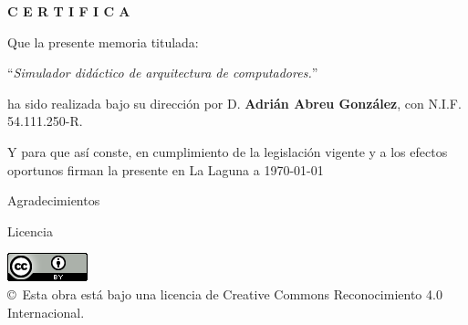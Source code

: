 \documentclass[spanish,a4paper,14pt,oneside]{extreport}
\begin{document}
\bigskip
\bigskip
{\bf C E R T I F I C A}

\bigskip
\bigskip
\bigskip
Que la presente memoria titulada:

\bigskip
``{\it Simulador didáctico de arquitectura de computadores.}''

\bigskip
\bigskip
\bigskip

\noindent ha sido realizada bajo su dirección por D. {\bf Adrián Abreu González},
con N.I.F. 54.111.250-R.

\bigskip
\bigskip

Y para que así conste, en cumplimiento de la legislación vigente y a los efectos
oportunos firman la presente en La Laguna a \today

\newpage
\thispagestyle{empty}

{ \flushright

\begin{LARGE}
Agradecimientos
\end{LARGE}

\hspace{3mm}

\begin{large}

\end{large}

}

\newpage

\begin{huge}
Licencia
\end{huge}

\bigskip
\begin{center}
\includegraphics[scale=1.5]{images/by_88x31}\\[10mm]
{\Large \copyright~Esta obra está bajo una licencia de Creative Commons Reconocimiento 4.0 Internacional.
}
\end{center}
\end{document}
